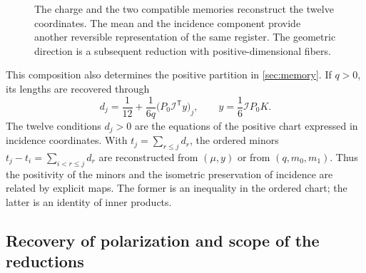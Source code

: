 \begin{figure}[htbp]
\centering
{}
\caption{The charge and the two compatible memories reconstruct the twelve
coordinates. The mean and the incidence component provide another
reversible representation of the same register. The geometric direction
is a subsequent reduction with positive-dimensional fibers.}
\label{rev4:ki:figure}
\end{figure}

This composition also determines the positive partition in
\ref{sec:memory}. If \(q>0\), its lengths are recovered through
\begin{equation}
 d_j=\frac1{12}+\frac{1}{6q}
             \bigl(P_0\mathcal I^{\mathsf T}y\bigr)_j,
 \qquad y=\frac16\mathcal I P_0K.
 \label{rev4:ki:positive-lengths}
\end{equation}
The twelve conditions \(d_j>0\) are the equations of the positive
chart expressed in incidence coordinates. With
\(t_j=\sum_{r\leq j}d_r\), the ordered minors
\(t_j-t_i=\sum_{i<r\leq j}d_r\) are reconstructed from
\((\mu,y)\) or from \((q,m_0,m_1)\). Thus the positivity of
the minors and the isometric preservation of incidence are related
by explicit maps. The former is an inequality in the ordered chart;
the latter is an identity of inner products.

\subsection{Recovery of polarization and scope of the reductions}
\label{rev4:ki:direction-subsection}

